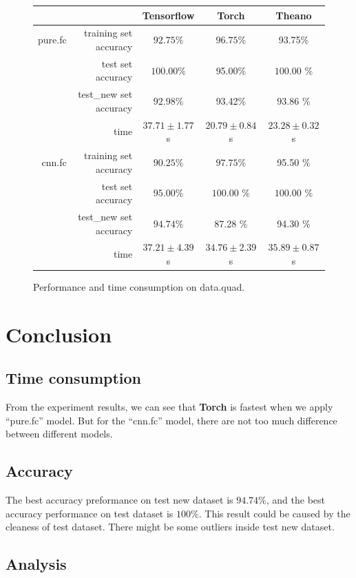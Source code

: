 \documentclass[a4paper]{article}
\begin{document}
\begin{figure}[H]
\centering
\begin{tabular}{|r|r|c|c|c|}
\hline
 & & Tensorflow & Torch & Theano \\
\hline
pure.fc & training set accuracy & $92.75\%$ & $\bm{96.75}$\% & 93.75\% \\
 & test set accuracy & $\bm{100.00}\%$ & 95.00\% & $\bm{100.00}$ \% \\
 & test\_new set accuracy & $92.98\%$ & 93.42\% & $\bm{93.86}$ \% \\
 & time & $37.71\pm1.77$s & $\bm{20.79 \pm 0.84}$ s & $23.28 \pm 0.32$s\\
\hline
cnn.fc & training set accuracy & $90.25\%$ & $\bm{97.75}$\% & 95.50 \% \\
 & test set accuracy & $95.00\%$ & $\bm{100.00}$ \% & $\bm{100.00}$ \% \\
 & test\_new set accuracy & $\bm{94.74}\%$ & 87.28 \% & 94.30 \% \\
 & time & $37.21\pm4.39$s & $\bm{34.76 \pm 2.39}$ s & $ 35.89 \pm 0.87$ s\\
\hline
\end{tabular}
\caption{Performance and time consumption on data.quad.}
\end{figure}

\section{Conclusion}

\subsection{Time consumption}

From the experiment results, we can see that \textbf{Torch} is fastest when we apply ``pure.fc'' model. But for the ``cnn.fc'' model, there are not too much difference between different models.

\subsection{Accuracy}

The best accuracy preformance on test new dataset is $94.74\%$, and the best accuracy performance on test dataset is $100\%$. This result could be caused by the cleaness of test dataset. There might be some outliers inside test new dataset.

\subsection{Analysis}
\end{document}
